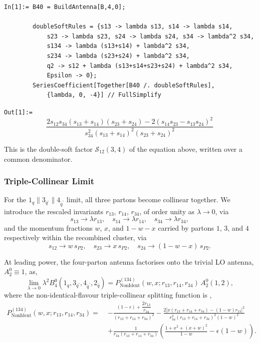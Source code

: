 \begin{mdframed}[backgroundcolor=gray!10, linewidth=0pt]
\begin{lstlisting}
In[1]:= B40 = BuildAntenna[B,4,0];

        doubleSoftRules = {s13 -> lambda s13, s14 -> lambda s14,
            s23 -> lambda s23, s24 -> lambda s24, s34 -> lambda^2 s34,
            s134 -> lambda (s13+s14) + lambda^2 s34,
            s234 -> lambda (s23+s24) + lambda^2 s34,
            q2 -> s12 + lambda (s13+s14+s23+s24) + lambda^2 s34,
            Epsilon -> 0};
        SeriesCoefficient[Together[B40 /. doubleSoftRules],
            {lambda, 0, -4}] // FullSimplify
\end{lstlisting}
\texttt{Out[1]:=}
    \begin{equation*}
        \frac{2s_{12}s_{34}(s_{13}+s_{14})(s_{23}+s_{24})-2\left(s_{14}s_{23}-s_{13}s_{24}\right)^2}{s_{34}^2(s_{13}+s_{14})^2(s_{23}+s_{24})^2}
    \end{equation*}
\end{mdframed}
This is the double-soft factor $\mathcal S_{12}(3,4)$ of the equation above, written over a common denominator.


\subsubsection{Triple-Collinear Limit}

For the $1_q\parallel 3_{q^\prime}\parallel 4_{\bar q^\prime}$ limit, all three partons become collinear together. We
introduce the rescaled invariants $r_{13}$, $r_{14}$, $r_{34}$, of order unity as $\lambda\to0$, via
\begin{equation}
    s_{13}\to\lambda r_{13},\quad s_{14}\to\lambda r_{14},\quad s_{34}\to\lambda r_{34},
\end{equation}
and the momentum fractions $w$, $x$, and $1-w-x$ carried by partons $1$, $3$, and $4$ respectively
within the recombined cluster, via
\begin{equation}
    s_{12}\to w\,s_{P2},\quad s_{23}\to x\,s_{P2},\quad s_{24}\to(1-w-x)\,s_{P2}.
\end{equation}

At leading power, the four-parton antenna factorises onto the trivial LO antenna, $A_2^0\equiv1$, as,
\begin{equation}
    \lim_{\lambda\to0}\lambda^2 B_4^0(1_q,3_{q^\prime},4_{\bar q^\prime},2_{\bar q}) = P_\mathrm{NonIdent}^{(134)}(w,x;r_{13},r_{14},r_{34})\,A_2^0(1,2),
\end{equation}
where the non-identical-flavour triple-collinear splitting function is \cite{Gehrmann-DeRidder:2005btv},
\begin{equation}
    \begin{split}
        P_\mathrm{NonIdent}^{(134)}(w,x;r_{13},r_{14},r_{34}) =\;&
            -\frac{(1-\epsilon)+\dfrac{2r_{13}}{r_{34}}}{(r_{13}+r_{14}+r_{34})^2}
            -\frac{2\big[x(r_{13}+r_{14}+r_{34})-(1-w)r_{13}\big]^2}{r_{34}^2(r_{13}+r_{14}+r_{34})^2(1-w)^2}\\
            &+\frac{1}{r_{34}(r_{13}+r_{14}+r_{34})}\left(\frac{1+x^2+(x+w)^2}{1-w}-\epsilon(1-w)\right).
    \end{split}
\end{equation}

